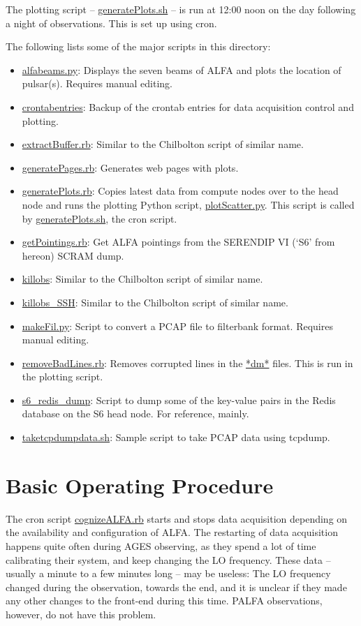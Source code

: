 \documentclass{article}
\begin{document}
The plotting script -- \url{generatePlots.sh} -- is run at 12:00 noon on the
day following a night of observations. This is set up using cron.

The following lists some of the major scripts in this directory:

\begin{itemize}
\item \url{alfabeams.py}: Displays the seven beams of ALFA and plots the
location of pulsar(s). Requires manual editing.
\item \url{crontabentries}: Backup of the crontab entries for data acquisition
control and plotting.
\item \url{extractBuffer.rb}: Similar to the Chilbolton script of similar name.
\item \url{generatePages.rb}: Generates web pages with plots.
\item \url{generatePlots.rb}: Copies latest data from compute nodes over to the
head node and runs the plotting Python script, \url{plotScatter.py}. This
script is called by \url{generatePlots.sh}, the cron script.
\item \url{getPointings.rb}: Get ALFA pointings from the SERENDIP VI (`S6' from
hereon) SCRAM dump.
\item \url{killobs}: Similar to the Chilbolton script of similar name.
\item \url{killobs_SSH}: Similar to the Chilbolton script of similar name.
\item \url{makeFil.py}: Script to convert a PCAP file to filterbank format.
Requires manual editing.
\item \url{removeBadLines.rb}: Removes corrupted lines in the \url{*dm*} files.
This is run in the plotting script.
\item \url{s6_redis_dump}: Script to dump some of the key-value pairs in the
Redis database on the S6 head node. For reference, mainly.
\item \url{taketcpdumpdata.sh}: Sample script to take PCAP data using tcpdump.
\end{itemize}


\section{Basic Operating Procedure}

The cron script \url{cognizeALFA.rb} starts and stops data acquisition
depending on the availability and configuration of ALFA. The restarting of data
acquisition happens quite often during AGES observing, as they spend a lot of
time calibrating their system, and keep changing the LO frequency. These data
-- usually a minute to a few minutes long -- may be useless: The LO frequency
changed during the observation, towards the end, and it is unclear if they made
any other changes to the front-end during this time. PALFA observations,
however, do not have this problem.
\end{document}
